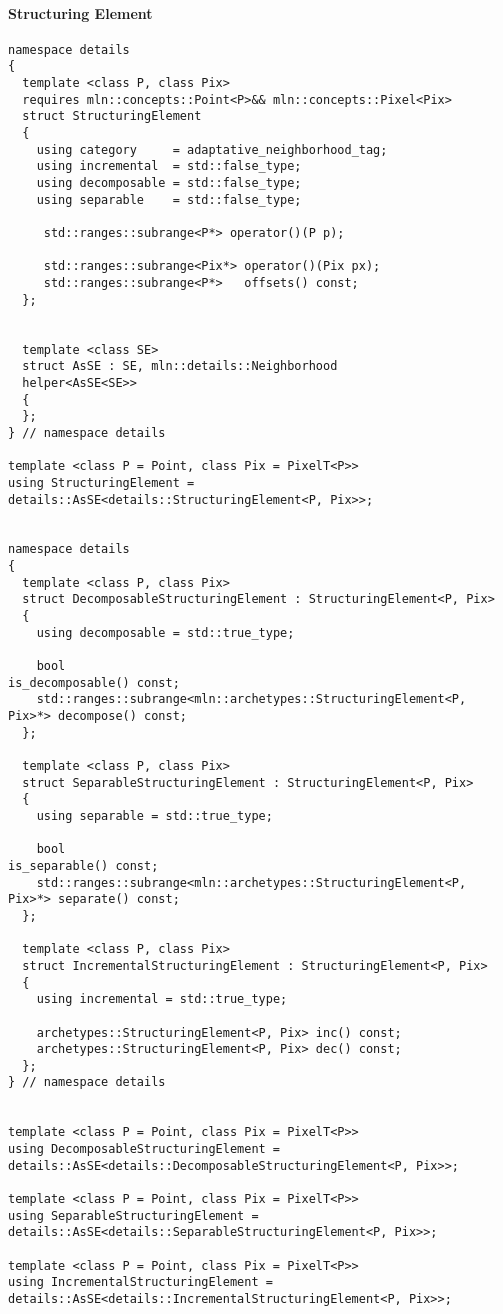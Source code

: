 \paragraph{Structuring Element}

\begin{verbatim}
namespace details
{
  template <class P, class Pix>
  requires mln::concepts::Point<P>&& mln::concepts::Pixel<Pix>
  struct StructuringElement
  {
    using category     = adaptative_neighborhood_tag;
    using incremental  = std::false_type;
    using decomposable = std::false_type;
    using separable    = std::false_type;

     std::ranges::subrange<P*> operator()(P p);

     std::ranges::subrange<Pix*> operator()(Pix px);
     std::ranges::subrange<P*>   offsets() const;
  };


  template <class SE>
  struct AsSE : SE, mln::details::Neighborhood
  helper<AsSE<SE>>
  {
  };
} // namespace details

template <class P = Point, class Pix = PixelT<P>>
using StructuringElement = details::AsSE<details::StructuringElement<P, Pix>>;


namespace details
{
  template <class P, class Pix>
  struct DecomposableStructuringElement : StructuringElement<P, Pix>
  {
    using decomposable = std::true_type;

    bool                                                                is_decomposable() const;
    std::ranges::subrange<mln::archetypes::StructuringElement<P, Pix>*> decompose() const;
  };

  template <class P, class Pix>
  struct SeparableStructuringElement : StructuringElement<P, Pix>
  {
    using separable = std::true_type;

    bool                                                                is_separable() const;
    std::ranges::subrange<mln::archetypes::StructuringElement<P, Pix>*> separate() const;
  };

  template <class P, class Pix>
  struct IncrementalStructuringElement : StructuringElement<P, Pix>
  {
    using incremental = std::true_type;

    archetypes::StructuringElement<P, Pix> inc() const;
    archetypes::StructuringElement<P, Pix> dec() const;
  };
} // namespace details


template <class P = Point, class Pix = PixelT<P>>
using DecomposableStructuringElement = details::AsSE<details::DecomposableStructuringElement<P, Pix>>;

template <class P = Point, class Pix = PixelT<P>>
using SeparableStructuringElement = details::AsSE<details::SeparableStructuringElement<P, Pix>>;

template <class P = Point, class Pix = PixelT<P>>
using IncrementalStructuringElement = details::AsSE<details::IncrementalStructuringElement<P, Pix>>;
\end{verbatim}


